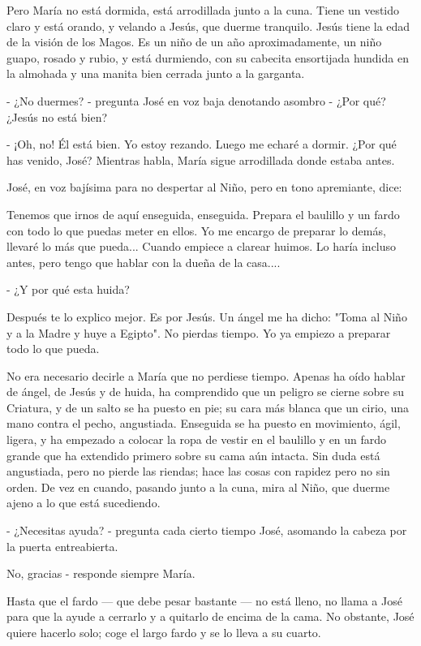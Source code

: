\documentclass[12pt, twoside, openright]{book} %
\begin{document}
Pero María no está dormida, está arrodillada junto a la cuna. Tiene un vestido claro y está orando, y velando a Jesús, que duerme tranquilo. Jesús tiene la edad de la visión de los Magos. Es un niño de un año aproximadamente, un niño guapo, rosado y rubio, y está durmiendo, con su cabecita ensortijada hundida en la almohada y una manita bien cerrada junto a la garganta. 

- ¿No duermes? - pregunta José en voz baja denotando asombro - ¿Por qué? ¿Jesús no está bien? 

- ¡Oh, no! Él está bien. Yo estoy rezando. Luego me echaré a dormir. ¿Por qué has venido, José? Mientras habla, María sigue arrodillada donde estaba antes. 

José, en voz bajísima para no despertar al Niño, pero en tono apremiante, dice: 

Tenemos que irnos de aquí enseguida, enseguida. Prepara el baulillo y un fardo con todo lo que puedas meter en ellos. Yo me encargo de preparar lo demás, llevaré lo más que pueda... Cuando empiece a clarear huimos. Lo haría incluso antes, pero tengo que hablar con la dueña de la casa.... 

- ¿Y por qué esta huida? 

Después te lo explico mejor. Es por Jesús. Un ángel me ha dicho: "Toma al Niño y a la Madre y huye a Egipto". No pierdas tiempo. Yo ya empiezo a preparar todo lo que pueda. 

No era necesario decirle a María que no perdiese tiempo. Apenas ha oído hablar de ángel, de Jesús y de huida, ha comprendido que un peligro se cierne sobre su Criatura, y de un salto se ha puesto en pie; su cara más blanca que un cirio, una mano contra el pecho, angustiada. Enseguida se ha puesto en movimiento, ágil, ligera, y ha empezado a colocar la ropa de vestir en el baulillo y en un fardo grande que ha extendido primero sobre su cama aún intacta. Sin duda está angustiada, pero no pierde las riendas; hace las cosas con rapidez pero no sin orden. De vez en cuando, pasando junto a la cuna, mira al Niño, que duerme ajeno a lo que está sucediendo. 

- ¿Necesitas ayuda? - pregunta cada cierto tiempo José, asomando la cabeza por la puerta entreabierta. 

No, gracias - responde siempre María. 

Hasta que el fardo — que debe pesar bastante — no está lleno, no llama a José para que la ayude a cerrarlo y a quitarlo de encima de la cama. No obstante, José quiere hacerlo solo; coge el largo fardo y se lo lleva a su cuarto. 
\end{document}
